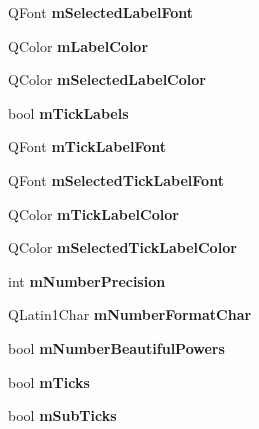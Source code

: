 \begin{DoxyCompactItemize}
Q\+Font {\bfseries m\+Selected\+Label\+Font}
\item 
\mbox{\label{classQCPAxis_a457a003bb1c2b6ab73e5a173ba7558fd}} 
Q\+Color {\bfseries m\+Label\+Color}
\item 
\mbox{\label{classQCPAxis_a94f57de3ba024471ca206d83cf2258dd}} 
Q\+Color {\bfseries m\+Selected\+Label\+Color}
\item 
\mbox{\label{classQCPAxis_a3e4315be072026644e69009557a2fa11}} 
bool {\bfseries m\+Tick\+Labels}
\item 
\mbox{\label{classQCPAxis_add79d1e39c4ed65869a1e9cc79043f3f}} 
Q\+Font {\bfseries m\+Tick\+Label\+Font}
\item 
\mbox{\label{classQCPAxis_a4f2e4919da9615dac612662c249b1119}} 
Q\+Font {\bfseries m\+Selected\+Tick\+Label\+Font}
\item 
\mbox{\label{classQCPAxis_a6384a749b3b56a97df081d8082321ab4}} 
Q\+Color {\bfseries m\+Tick\+Label\+Color}
\item 
\mbox{\label{classQCPAxis_a3bcad40902f45dc4c991a2c3e4d31d70}} 
Q\+Color {\bfseries m\+Selected\+Tick\+Label\+Color}
\item 
\mbox{\label{classQCPAxis_acd76e8c783384d99ccc4a13797eec188}} 
int {\bfseries m\+Number\+Precision}
\item 
\mbox{\label{classQCPAxis_a39594313deef458f425bba25cd337a8a}} 
Q\+Latin1\+Char {\bfseries m\+Number\+Format\+Char}
\item 
\mbox{\label{classQCPAxis_af03809bee3f3e35fcc38d25b6dd5003b}} 
bool {\bfseries m\+Number\+Beautiful\+Powers}
\item 
\mbox{\label{classQCPAxis_ab111e74bba22e06848897c932fc549fe}} 
bool {\bfseries m\+Ticks}
\item 
\mbox{\label{classQCPAxis_af16aab9c3effa482fa10e7dd5c3d91f3}} 
bool {\bfseries m\+Sub\+Ticks}
\item 

\end{DoxyCompactItemize}
